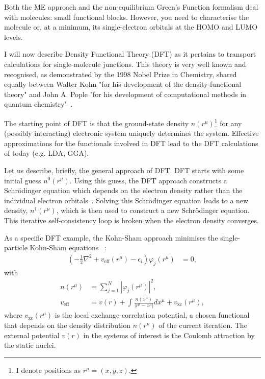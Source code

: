 Both the ME approach and the non-equilibrium Green's Function formalism deal with molecules: small functional blocks. However, you need to characterise the molecule or, at a minimum, its single-electron orbitals at the HOMO and LUMO levels. 

I will now describe Density Functional Theory (DFT) as it pertains to transport calculations for single-molecule junctions. This theory is very well known and recognised, as demonstrated by the 1998 Nobel Prize in Chemistry, shared equally between Walter Kohn "for his development of the density-functional theory" and John A. Pople "for his development of computational methods in quantum chemistry"~\cite{nobel1998}. 

The starting point of DFT is that the ground-state density $n(r^\mu)$\footnote{I denote positions as $r^\mu = (x,y,z)$.} for any (possibly interacting) electronic system uniquely determines the system. Effective approxim\-ations for the functionals involved in DFT lead to the DFT calculations of today (e.g. LDA, GGA). 

Let us describe, briefly, the general approach of DFT. DFT starts with some initial guess $n^0(r^\mu)$. Using this guess, the DFT approach constructs a Schr\"odinger equation which depends on the electron density rather than the individual electron orbit\-als~\cite{joscomp}. Solving this Schr\"odinger equation leads to a new density, $n^1(r^\mu)$, which is then used to construct a new Schr\"odinger equation. This iterative self-consistency loop is broken when the electron density converges.

As a specific DFT example, the Kohn-Sham approach minimises the single-particle Kohn-Sham equations ~\cite{kohnsham, joscomp}:
\begin{align}
\left( -\frac{1}{2} \nabla^2 + v_\text{eff} (r^\mu) - \epsilon_i \right) \varphi_j( r^\mu) &= 0, \label{eq:ks}
\end{align}
with
\begin{align*}
n(r^\mu) &= \sum_{j=1}^N \left| \varphi_j (r^\mu)\right|^2,\\
v_\text{eff} &= v(r) + \int \frac{n(x^\mu)}{\left|r^\mu - x^\mu\right|} dx^\mu + v_\text{xc}(r^\mu),
\end{align*}
where $v_\text{xc}(r^\mu)$ is the local exchange-correlation potential, a chosen functional that depends on the density distribution $n(r^\mu)$ of the current iteration. The external potential $v(r)$ in the systems of interest is the Coulomb attraction by the static nuclei.


